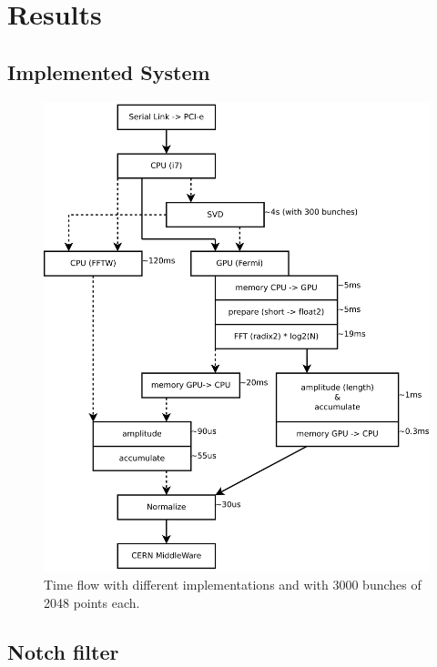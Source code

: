 %

\chapter{Results}

\section{Implemented System}

\begin{figure}
\caption{Time flow with different implementations and with 3000 bunches of 
2048 points each.}
\centering
\includegraphics[scale=0.4]{PC-flow.pdf}
\end{figure}


\section{Notch filter}

